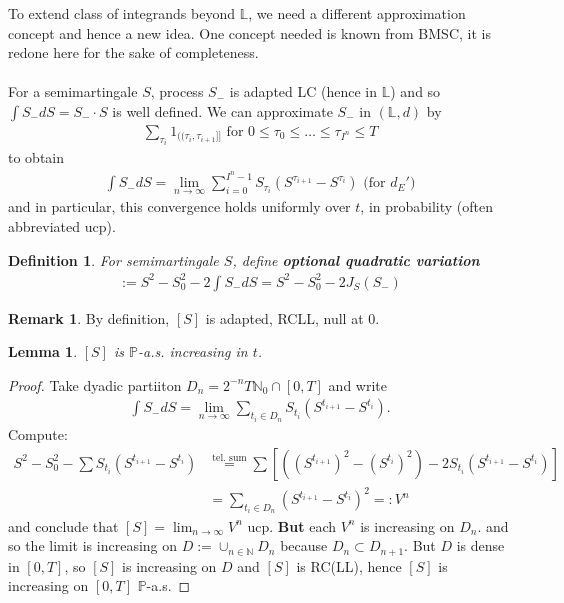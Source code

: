 \documentclass[12pt,a4paper, twoside]{article}
\newtheorem{lem}{Lemma}[section]
\newtheorem{defn}{Definition}[section]
\theoremstyle{definition}
\newtheorem{rem}{Remark}[section]
\newcommand{\PP}{\mathbb{P}} %
\begin{document}
\newpage
To extend class of integrands beyond $\mathbb{L}$, we need a different approximation concept and hence a new idea. One concept needed is known from BMSC, it is redone here for the sake of completeness. 
\\\\
For a semimartingale $S$, process $S_-$ is adapted LC (hence in $\mathbb{L}$) and so  $\int S_- dS = S_- \cdot S$ is well defined. We can approximate $S_-$ in $( \mathbb{L},d)$ by
\begin{align*}
\sum_{\tau_i} 1_{(\!( \tau_i, \tau_{i+1}]\!]} \text{ for } 0 \leq \tau_0 \leq \dots \leq \tau_{I^n} \leq T
\end{align*}
to obtain
\begin{align*}
\int S_- dS = \lim_{n \to \infty} \sum_{i=0}^{I^n-1} S_{\tau_i}( S^{\tau_{i+1}}- S^{\tau_i}) \text{ (for $d_E'$)}
\end{align*}
and in particular, this convergence holds uniformly over $t$, in probability (often abbreviated ucp). 
\begin{defn} For semimartingale $S$, define \textbf{optional quadratic variation}
\begin{align*}
[S]:= S^2-S_0^2-2 \int S_- dS = S^2-S_0^2- 2 J_S(S_-)
\end{align*} 
\end{defn}
\begin{rem} By definition, $[S]$ is adapted, RCLL, null at $0$. 
\end{rem}
\begin{lem} \label{L36} $[S]$ is $\PP$-a.s. increasing in $t$. 
\end{lem}
\begin{proof}
Take dyadic partiiton $D_n = 2^{-n} T \mathbb{N}_0 \cap [0,T]$ and write 
\begin{align*}
\int S_- dS = \lim_{n \to \infty} \sum_{t_i \in D_n} S_{t_i} ( S^{t_{i+1}}-S^{t_i}).
\end{align*}
Compute:
\begin{align*}
S^2-S_0^2- \sum S_{t_i} (S^{t_{i+1}}-S^{t_i}) &\overset{\text{tel. sum}}= \sum \left[ ((S^{t_{i+1}})^2-(S^{t_i})^2)-2 S_{t_i}(S^{t_{i+1}}-S^{t_i}) \right] \\
& = \sum_{t_i \in D_n} (S^{t_{i+1}}-S^{t_i})^2 =:V^n
\end{align*}
and conclude that $[S] = \lim_{n \to \infty} V^n$ ucp. \textbf{But} each $V^n$ is increasing on $D_n$. and so the limit is increasing on $D:= \cup_{n \in \mathbb{N}} D_n$ because $D_n \subset D_{n+1}$. But $D$ is dense in $[0,T]$, so $[S]$ is increasing on $D$ and $[S]$ is RC(LL),  hence $[S]$ is increasing on $[0,T] $ $\PP$-a.s.
\end{proof}
\end{document}
